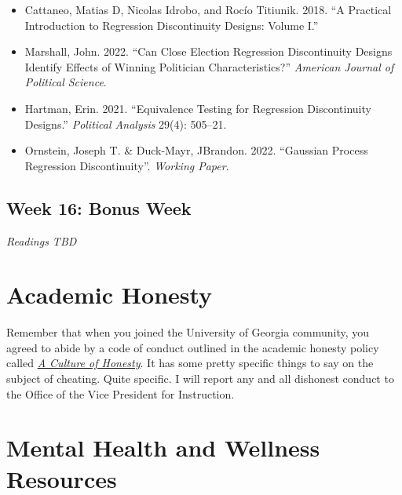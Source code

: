 \documentclass[11pt, letterpaper]{article}
\begin{document}
\begin{itemize}
	
	\item Cattaneo, Matias D, Nicolas Idrobo, and Rocío Titiunik. 2018. ``A Practical Introduction to Regression Discontinuity Designs: Volume I.''
	\item Marshall, John. 2022. ``Can Close Election Regression Discontinuity Designs Identify Effects of Winning Politician Characteristics?'' \textit{American Journal of Political Science}.
	\item Hartman, Erin. 2021. ``Equivalence Testing for Regression Discontinuity Designs.'' \textit{Political Analysis} 29(4): 505–21.
	\item Ornstein, Joseph T. \& Duck-Mayr, JBrandon. 2022. ``Gaussian Process Regression Discontinuity''. \textit{Working Paper}.
\end{itemize}

\subsection*{Week 16: Bonus Week}

\textit{Readings TBD}


\section*{Academic Honesty}

Remember that when you joined the University of Georgia community, you agreed to abide by a code of conduct outlined in the academic honesty policy called \href{https://honesty.uga.edu/Academic-Honesty-Policy/Introduction/}{\textit{A Culture of Honesty}}. It has some pretty specific things to say on the subject of cheating. Quite specific. I will report any and all dishonest conduct to the Office of the Vice President for Instruction.

\section*{Mental Health and Wellness Resources}
\end{document}
